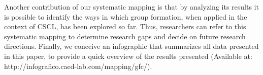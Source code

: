 Another contribution of our systematic mapping is that by analyzing its results it is possible to identify the ways in which group formation, when applied in the context of CSCL, has been explored so far. Thus, researchers can refer to this systematic mapping to determine research gaps and decide on future research directions. Finally, we conceive an infographic that summarizes all data presented in this paper, to provide a quick overview of the results presented (Available at: http://infografico.caed-lab.com/mapping/gfc/).









